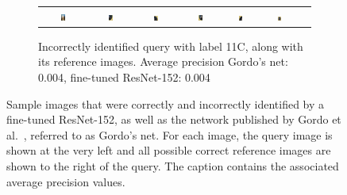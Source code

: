 \begin{figure}
\begin{subfigure}{\textwidth}
\begin{tabular}{|c|*{6}{c}}
\includegraphics[width=0.12\textwidth]{img/11C-0351.JPG} &
\includegraphics[width=0.12\textwidth]{img/11C-0.JPG} &
\includegraphics[width=0.12\textwidth]{img/11C-1.JPG} &
\includegraphics[width=0.12\textwidth]{img/11C-2.JPG} &
\includegraphics[width=0.12\textwidth]{img/11C-3.JPG} &
\includegraphics[width=0.12\textwidth]{img/11C-4.JPG} \\
\end{tabular}
\caption{Incorrectly identified query with label 11C,
along with its reference images.\newline
Average precision Gordo's net: 0.004, fine-tuned ResNet-152: 0.004
\label{fig:incorrect11C}}
\end{subfigure}
\caption{Sample images that were correctly and incorrectly identified
by a fine-tuned ResNet-152, as well as the network published by Gordo
et al.~\cite{gordo_deep_2016}, referred to as Gordo's net. For each image,
the query image is shown at the very left and all possible correct reference
images are shown to the right of the query. The caption contains the
associated average precision values.
\label{fig:incorrectimg}}
\end{figure}

